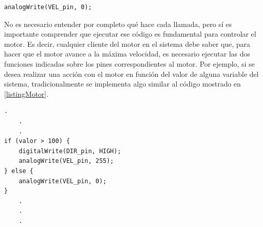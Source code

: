 \begin{lstlisting}[caption=Detener giro del motor paso a paso., label={codigoDet}]
analogWrite(VEL_pin, 0);
\end{lstlisting}

No es necesario entender por completo qué hace cada llamada, pero sí es importante comprender que ejecutar ese código es fundamental para controlar el motor. Es decir, cualquier cliente del motor en el sistema debe saber que, para hacer que el motor avance a la máxima velocidad, es necesario ejecutar las dos funciones indicadas sobre los pines correspondientes al motor. Por ejemplo, si se desea realizar una acción con el motor en función del valor de alguna variable del sistema, tradicionalmente se implementa algo similar al código mostrado en \ref{listingMotor}.

\begin{lstlisting}[caption=Ejemplo uso del motor paso a paso.,label={listingMotor}]
    .
    .
    .
if (valor > 100) {
    digitalWrite(DIR_pin, HIGH);
    analogWrite(VEL_pin, 255);
} else {
    analogWrite(VEL_pin, 0);
}
    .
    .
    .
\end{lstlisting}

